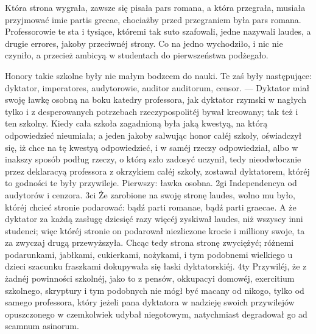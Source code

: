 \documentclass{book}
\begin{document}
Która strona wygrała, zawsze się pisała pars romana, a która przegrała, musiała przyjmować imie partis grecae, chociażby przed przegraniem była pars romana. Professorowie te sta i tysiące, któremi tak suto szafowali, jedne nazywali laudes, a drugie errores, jakoby przeciwnéj strony. Co na jedno wychodziło, i nic nie czyniło, a przecież ambicyą w studentach do pierwszeństwa podżegało.

Honory takie szkolne były nie małym bodzcem do nauki. Te zaś były następujące: dyktator, imperatores, audytorowie, auditor auditorum, censor. — Dyktator miał swoję ławkę osobną na boku katedry professora, jak dyktator rzymski w nagłych tylko i z desperowanych potrzebach rzeczypospolitéj bywał kreowany; tak też i ten szkolny. Kiedy cała szkoła zagadnioną była jaką kwestyą, na którą odpowiedzieć nieumiała; a jeden jakoby salwując honor całéj szkoły, oświadczył się, iż chce na tę kwestyą odpowiedzieć, i w saméj rzeczy odpowiedział, albo w inakszy sposób podług rzeczy, o którą szło zadosyć uczynił, tedy nieodwłocznie przez deklaracyą professora z okrzykiem całéj szkoły, zostawał dyktatorem, któréj to godności te były przywileje. Pierwszy: ławka osobna. 2gi Independencya od audytorów i cenzora. 3ci Że zarobione na swoję stronę laudes, wolno mu było, któréj chcieć stronie podarować: bądź parti romanae, bądź parti graecae. A że dyktator za każdą zasługę dziesięć razy więcéj zyskiwał laudes, niż wszyscy inni studenci; więc któréj stronie on podarował niezliczone krocie i milliony swoje, ta za zwyczaj drugą przewyższyła. Chcąc tedy strona stronę zwyciężyć; różnemi podarunkami, jabłkami, cukierkami, nożykami, i tym podobnemi wielkiego u dzieci szacunku fraszkami dokupywała się łaski dyktatorskiéj. 4ty Przywiléj, że z żadnéj powinności szkolnéj, jako to z pensów, okkupacyi domowéj, exercitium szkolnego, skryptury i tym podobnych nie mógł być macany od nikogo, tylko od samego professora, który jeżeli pana dyktatora w nadzieję swoich przywilejów opuszczonego w czemkolwiek udybał niegotowym, natychmiast degradował go ad scamnum asinorum.
\end{document}
